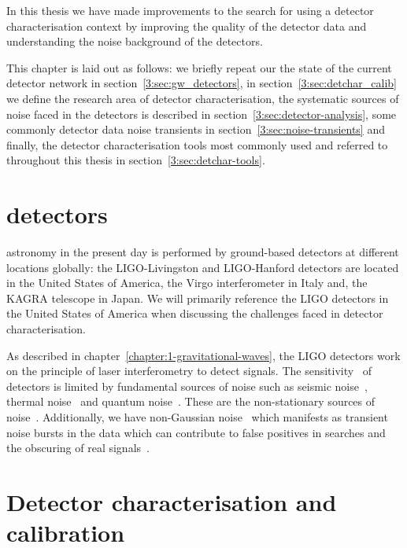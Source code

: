 
In this thesis we have made improvements to the search for \gws using a detector characterisation context by improving the quality of the detector data and understanding the noise background of the detectors. 

This chapter is laid out as follows: we briefly repeat our the state of the current \gwadj detector network in section~\ref{3:sec:gw_detectors}, in section~\ref{3:sec:detchar_calib} we define the research area of detector characterisation, the systematic sources of noise faced in the detectors is described in section~\ref{3:sec:detector-analysis}, some commonly detector data noise transients in section~\ref{3:sec:noise-transients} and finally, the detector characterisation tools most commonly used and referred to throughout this thesis in section~\ref{3:sec:detchar-tools}.

\section{\label{3:sec:gw_detectors}\Gwadj detectors}

\Gwadj astronomy in the present day is performed by ground-based detectors at different locations globally: the LIGO-Livingston and LIGO-Hanford detectors are located in the United States of America, the Virgo interferometer in Italy and, the KAGRA telescope in Japan. We will primarily reference the LIGO detectors in the United States of America when discussing the challenges faced in detector characterisation. 

As described in chapter~\ref{chapter:1-gravitational-waves}, the LIGO detectors work on the principle of laser interferometry to detect \gwadj signals. The sensitivity~\cite{aLIGO_design_curve:2018} of \gwadj detectors is limited by fundamental sources of noise such as seismic noise~\cite{Glanzer:2023}, thermal noise~\cite{thermal_noise:2018} and quantum noise~\cite{quantum_noise:2003}. These are the non-stationary sources of noise~\cite{PSD_var:2020}. Additionally, we have non-Gaussian noise~\cite{Noise_Guide:2020} which manifests as transient noise bursts in the data which can contribute to false positives in \gwadj searches and the obscuring of real \gwadj signals~\cite{GW170817:2017, GW150914_noise:2016}.

\section{\label{3:sec:detchar_calib}Detector characterisation and calibration}

